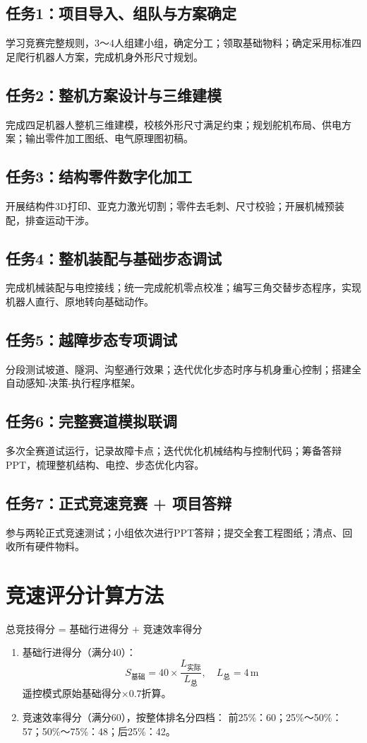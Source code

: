 \documentclass[11pt,a4paper]{article}
\begin{document}
\subsection{任务1：项目导入、组队与方案确定}
学习竞赛完整规则，3～4人组建小组，确定分工；领取基础物料；确定采用标准四足爬行机器人方案，完成机身外形尺寸规划。

\subsection{任务2：整机方案设计与三维建模}
完成四足机器人整机三维建模，校核外形尺寸满足约束；规划舵机布局、供电方案；输出零件加工图纸、电气原理图初稿。

\subsection{任务3：结构零件数字化加工}
开展结构件3D打印、亚克力激光切割；零件去毛刺、尺寸校验；开展机械预装配，排查运动干涉。

\subsection{任务4：整机装配与基础步态调试}
完成机械装配与电控接线；统一完成舵机零点校准；编写三角交替步态程序，实现机器人直行、原地转向基础动作。

\subsection{任务5：越障步态专项调试}
分段测试坡道、隧洞、沟壑通行效果；迭代优化步态时序与机身重心控制；搭建全自动感知-决策-执行程序框架。

\subsection{任务6：完整赛道模拟联调}
多次全赛道试运行，记录故障卡点；迭代优化机械结构与控制代码；筹备答辩PPT，梳理整机结构、电控、步态优化内容。

\subsection{任务7：正式竞速竞赛 + 项目答辩}
参与两轮正式竞速测试；小组依次进行PPT答辩；提交全套工程图纸；清点、回收所有硬件物料。

\section{竞速评分计算方法}
总竞技得分 = 基础行进得分 + 竞速效率得分
\begin{enumerate}
    \item 基础行进得分（满分40）：
    $$S_{\text{基础}} = 40 \times \frac{L_{\text{实际}}}{L_{\text{总}}},\quad L_{\text{总}}=4\,\text{m}$$
    遥控模式原始基础得分$\times 0.7$折算。
    \item 竞速效率得分（满分60），按整体排名分四档：
    前25\%：60；25\%～50\%：57；50\%～75\%：48；后25\%：42。
\end{enumerate}
\end{document}
